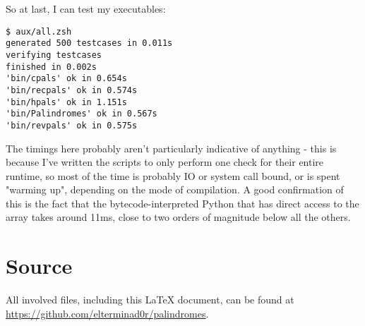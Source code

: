 \documentclass[fleqn,a4paper,11pt]{article}
\begin{document}
    So at last, I can test my executables:

\begin{lstlisting}[caption=Actual testing]
$ aux/all.zsh
generated 500 testcases in 0.011s
verifying testcases
finished in 0.002s
'bin/cpals' ok in 0.654s
'bin/recpals' ok in 0.574s
'bin/hpals' ok in 1.151s
'bin/Palindromes' ok in 0.567s
'bin/revpals' ok in 0.575s
\end{lstlisting}
\iffalse $ \fi %

    The timings here probably aren't particularly indicative of anything - this
    is because I've written the scripts to only perform one check for their
    entire runtime, so most of the time is probably IO or system call bound, or
    is spent "warming up", depending on the mode of compilation. A good
    confirmation of this is the fact that the bytecode-interpreted Python that
    has direct access to the array takes around 11ms, close to two orders of
    magnitude below all the others.

    \section{Source}

    All involved files, including this \LaTeX{} document, can be found at
    \url{https://github.com/elterminad0r/palindromes}.
\end{document}
